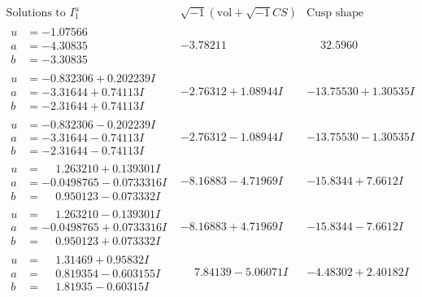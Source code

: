 \documentclass[1p]{elsarticle_modified}
\theoremstyle{definition}
\newcommand{\I}{\sqrt{-1}}
\begin{document}
$$\begin{array}{c|c|c}  
\text{Solutions to }I^u_{1}& \I (\text{vol} + \sqrt{-1}CS) & \text{Cusp shape}\\
 \hline 
\begin{aligned}
u &= -1.07566\phantom{ +0.000000I} \\
a &= -4.30835\phantom{ +0.000000I} \\
b &= -3.30835\phantom{ +0.000000I}\end{aligned}
 & -3.78211\phantom{ +0.000000I} & \phantom{-}32.5960\phantom{ +0.000000I} \\ \hline\begin{aligned}
u &= -0.832306 + 0.202239 I \\
a &= -3.31644 + 0.74113 I \\
b &= -2.31644 + 0.74113 I\end{aligned}
 & -2.76312 + 1.08944 I & -13.75530 + 1.30535 I \\ \hline\begin{aligned}
u &= -0.832306 - 0.202239 I \\
a &= -3.31644 - 0.74113 I \\
b &= -2.31644 - 0.74113 I\end{aligned}
 & -2.76312 - 1.08944 I & -13.75530 - 1.30535 I \\ \hline\begin{aligned}
u &= \phantom{-}1.263210 + 0.139301 I \\
a &= -0.0498765 - 0.0733316 I \\
b &= \phantom{-}0.950123 - 0.073332 I\end{aligned}
 & -8.16883 - 4.71969 I & -15.8344 + 7.6612 I \\ \hline\begin{aligned}
u &= \phantom{-}1.263210 - 0.139301 I \\
a &= -0.0498765 + 0.0733316 I \\
b &= \phantom{-}0.950123 + 0.073332 I\end{aligned}
 & -8.16883 + 4.71969 I & -15.8344 - 7.6612 I \\ \hline\begin{aligned}
u &= \phantom{-}1.31469 + 0.95832 I \\
a &= \phantom{-}0.819354 - 0.603155 I \\
b &= \phantom{-}1.81935 - 0.60315 I\end{aligned}
 & \phantom{-}7.84139 - 5.06071 I & -4.48302 + 2.40182 I \\ \hline\begin{aligned}

\end{aligned}
\end{array}$$
\end{document}

